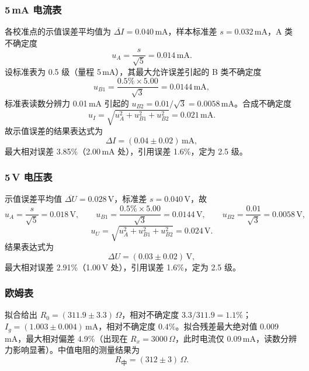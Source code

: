 \documentclass{Phyport}
\begin{document}
\subsubsection{5\,mA 电流表}

各校准点的示值误差平均值为 $\overline{\Delta I}=0.040\,\mathrm{mA}$，样本标准差 $s=0.032\,\mathrm{mA}$，A 类不确定度
\begin{equation}
    u_A=\frac{s}{\sqrt{5}}=0.014\,\mathrm{mA}.
\end{equation}
设标准表为 0.5 级（量程 5\,mA），其最大允许误差引起的 B 类不确定度
\begin{equation}
    u_{B1}=\frac{0.5\%\times5.00}{\sqrt{3}}=0.0144\,\mathrm{mA},
\end{equation}
标准表读数分辨力 0.01\,mA 引起的 $u_{B2}=0.01/\sqrt{3}=0.0058\,\mathrm{mA}$。合成不确定度
\begin{equation}
    u_I=\sqrt{u_A^2+u_{B1}^2+u_{B2}^2}=0.021\,\mathrm{mA}.
\end{equation}
故示值误差的结果表达式为
\begin{equation}
    \Delta I=(0.04\pm0.02)\,\mathrm{mA},
\end{equation}
最大相对误差 3.85\%（2.00\,mA 处），引用误差 1.6\%，定为 2.5 级。

\subsubsection{5\,V 电压表}

示值误差平均值 $\overline{\Delta U}=0.028\,\mathrm{V}$，标准差 $s=0.040\,\mathrm{V}$，故
\begin{equation}
    u_A=\frac{s}{\sqrt{5}}=0.018\,\mathrm{V},\qquad
    u_{B1}=\frac{0.5\%\times5.00}{\sqrt{3}}=0.0144\,\mathrm{V},\qquad
    u_{B2}=\frac{0.01}{\sqrt{3}}=0.0058\,\mathrm{V},
\end{equation}
\begin{equation}
    u_U=\sqrt{u_A^2+u_{B1}^2+u_{B2}^2}=0.024\,\mathrm{V}.
\end{equation}
结果表达式为
\begin{equation}
    \Delta U=(0.03\pm0.02)\,\mathrm{V},
\end{equation}
最大相对误差 2.91\%（1.00\,V 处），引用误差 1.6\%，定为 2.5 级。

\subsubsection{欧姆表}

拟合给出 $R_0=(311.9\pm3.3)\,\Omega$，相对不确定度 $3.3/311.9=1.1\%$；$I_g=(1.003\pm0.004)\,\mathrm{mA}$，相对不确定度 $0.4\%$。拟合残差最大绝对值 0.009\,mA，最大相对偏差 4.9\%（出现在 $R_x=3000\,\Omega$，此时电流仅 0.09\,mA，读数分辨力影响显著）。中值电阻的测量结果为
\begin{equation}
    R_{\text{中}}=(312\pm3)\,\Omega.
\end{equation}
\end{document}
